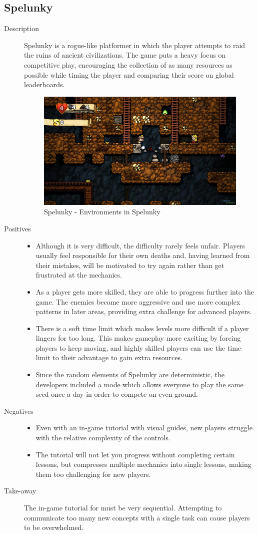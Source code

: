 \clearpage
\subsection{Spelunky}
\begin{description}
\item[Description]{Spelunky is a rogue-like platformer in which the player attempts to raid the ruins of ancient civilizations. The game puts a heavy focus on competitive play, encouraging the collection of as many resources as possible while timing the player and comparing their score on global leaderboards.

\begin{figure}[htb]
	\centering\includegraphics[width=.25\linewidth]{images/game_spelunky}
	\caption{Spelunky - Environments in Spelunky }
	\label{fig:spelunky}
\end{figure}}
\item[Positives]{
\begin{itemize}
\item{Although it is very difficult, the difficulty rarely feels unfair. Players usually feel responsible for their own deaths and, having learned from their mistakes, will be motivated to try again rather than get frustrated at the mechanics.}
\item{As a player gets more skilled, they are able to progress further into the game. The enemies become more aggressive and use more complex patterns in later areas, providing extra challenge for advanced players.}
\item{There is a soft time limit which makes levels more difficult if a player lingers for too long. This makes gameplay more exciting by forcing players to keep moving, and highly skilled players can use the time limit to their advantage to gain extra resources.}
\item{Since the random elements of Spelunky are deterministic, the developers included a mode which allows everyone to play the same seed once a day in order to compete on even ground.}
\end{itemize}
}
\item[Negatives]{
\begin{itemize}
\item{Even with an in-game tutorial with visual guides, new players struggle with the relative complexity of the controls.}
\item{The tutorial will not let you progress without completing certain lessons, but compresses multiple mechanics into single lessons, making them too challenging for new players.}
\end{itemize}
}
\item[Take-away]{The in-game tutorial for \ourgame{} must be very sequential. Attempting to communicate too many new concepts with a single task can cause players to be overwhelmed.

}
\end{description}
